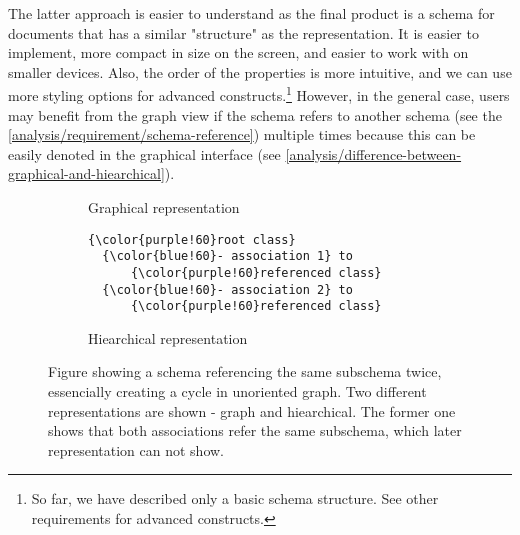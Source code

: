 The latter approach is easier to understand as the final product is a schema for documents that has a similar "structure" as the representation. It is easier to implement, more compact in size on the screen, and easier to work with on smaller devices. Also, the order of the properties is more intuitive, and we can use more styling options for advanced constructs.\footnote{So far, we have described only a basic schema structure. See other requirements for advanced constructs.} However, in the general case, users may benefit from the graph view if the schema refers to another schema (see the \autoref{analysis/requirement/schema-reference}) multiple times because this can be easily denoted in the graphical interface (see \autoref{analysis/difference-between-graphical-and-hiearchical}).

\begin{figure}[h!]\centering
  \begin{subfigure}{.5\textwidth}
      \centering
      \caption{Graphical representation}
    \end{subfigure}%
    \begin{subfigure}{.5\textwidth}
\begin{Verbatim}[commandchars=\\\{\}]
{\color{purple!60}root class}
  {\color{blue!60}- association 1} to
      {\color{purple!60}referenced class}
  {\color{blue!60}- association 2} to
      {\color{purple!60}referenced class}
\end{Verbatim}
      \caption{Hiearchical representation}
    \end{subfigure}

  \caption{Figure showing a schema referencing the same subschema twice, essencially creating a cycle in unoriented graph. Two different representations are shown - graph and hiearchical.  The former one shows that both associations refer the same subschema, which later representation can not show.}
  \label{analysis/difference-between-graphical-and-hiearchical}
\end{figure}

